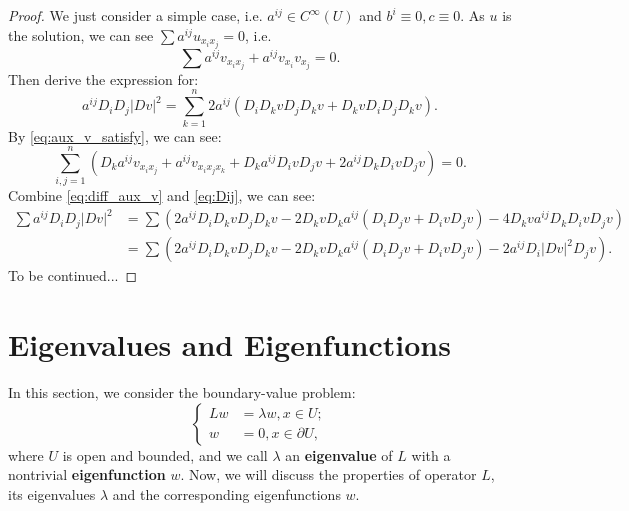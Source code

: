 \begin{proof}
    We just consider a simple case, i.e. $a^{ij}\in C^{\infty}(U)$ and $b^{i}\equiv 0, c\equiv 0$. As $u$ is the solution, we can see $\sum a^{ij}u_{x_{i}x_{j}}=0$, i.e. 
    \begin{equation}
        \label{eq:aux_v_satisfy}
        \sum a^{ij}v_{x_{i}x_{j}}+a^{ij}v_{x_{i}}v_{x_{j}}=0.
    \end{equation}
    Then derive the expression for:
    \begin{equation}
        \label{eq:Dij}
        a^{ij}D_{i}D_{j}|Dv|^{2}=\sum_{k=1}^{n}2a^{ij}(D_{i}D_{k}vD_{j}D_{k}v+D_{k}vD_{i}D_{j}D_{k}v).
    \end{equation}
    By \eqref{eq:aux_v_satisfy}, we can see:
    \begin{equation}
        \label{eq:diff_aux_v}
        \sum_{i,j=1}^{n}\left(D_{k}a^{ij}v_{x_{i}x_{j}}+a^{ij}v_{x_{i}x_{j}x_{k}}+D_{k}a^{ij}D_{i}vD_{j}v+2a^{ij}D_{k}D_{i}vD_{j}v\right)=0.
    \end{equation}
    Combine \eqref{eq:diff_aux_v} and \eqref{eq:Dij}, we can see:
    \begin{equation}
        \begin{aligned}
        \sum a^{ij}D_{i}D_{j}|Dv|^{2}&=\sum\left(2a^{ij}D_{i}D_{k}vD_{j}D_{k}v-2D_{k}vD_{k}a^{ij}\left(D_{i}D_{j}v+D_{i}vD_{j}v\right)-4D_{k}va^{ij}D_{k}D_{i}vD_{j}v\right)\\
        &=\sum\left(2a^{ij}D_{i}D_{k}vD_{j}D_{k}v-2D_{k}vD_{k}a^{ij}\left(D_{i}D_{j}v+D_{i}vD_{j}v\right)-2a^{ij}D_{i}|Dv|^{2}D_{j}v\right).
        \end{aligned}
    \end{equation}
    To be continued...
\end{proof}
\section{Eigenvalues and Eigenfunctions}
In this section, we consider the boundary-value problem:
\begin{equation}
    \label{eq:eig-value_prob}
    \left\{
        \begin{aligned}
            Lw&=\lambda w,x\in U;\\
            w&=0,x\in\partial U,
        \end{aligned}
    \right.
\end{equation}
where $U$ is open and bounded, and we call $\lambda$ an \textbf{eigenvalue} of $L$ with a nontrivial \textbf{eigenfunction} $w$. Now, we will discuss the properties of operator $L$, its eigenvalues $\lambda$ and the corresponding eigenfunctions $w$.
